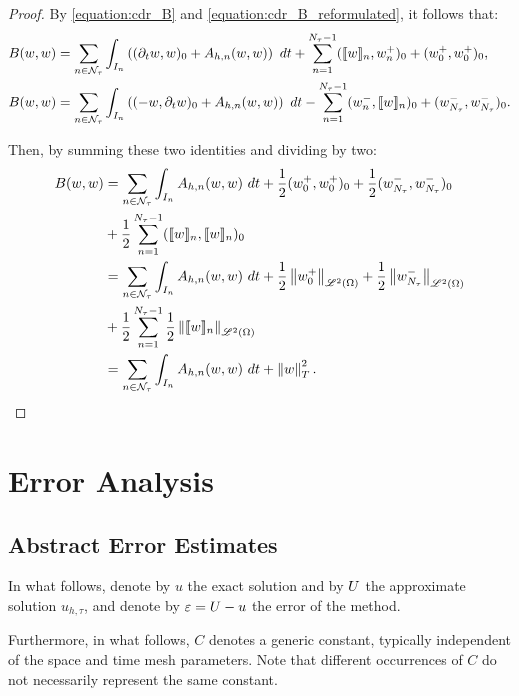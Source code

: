 \begin{proof}
    By \cref{equation:cdr_B} and \cref{equation:cdr_B_reformulated}, it follows that:
    \begin{align*}
        B(w, w) &= \sum_{n \in \mathcal{N}_{\tau}} \int_{I_n} \left( (\partial_t w, w )_0 + A_{h, n}(w, w) \right) ~ dt + \sum_{n = 1}^{N_{\tau} - 1} (\llbracket w \rrbracket_n, w_n^+ )_0 + (w_0^+, w_0^+ )_0, \\
        B(w, w) &= \sum_{n \in \mathcal{N}_{\tau}} \int_{I_n} \left( (-w, \partial_t w )_0 + A_{h, n}(w, w) \right) ~ dt - \sum_{n = 1}^{N_{\tau} - 1} (w_n^-, \llbracket w \rrbracket_n )_0 + (w_{N_{\tau}}^-, w_{N_{\tau}}^-)_0.
    \end{align*}

    Then, by summing these two identities and dividing by two:
    \begin{align*}
        B(w, w) &= \sum_{n \in \mathcal{N}_{\tau}} \int_{I_n} A_{h, n}(w, w) ~ dt + \frac12 (w_0^+, w_0^+ )_0 + \frac12 (w_{N_{\tau}}^-, w_{N_{\tau}}^-)_0 \\
        &+ \frac12 \sum_{n = 1}^{N_{\tau} - 1} (\llbracket w \rrbracket_n, \llbracket w \rrbracket_n )_0 \\
        &= \sum_{n \in \mathcal{N}_{\tau}} \int_{I_n} A_{h, n}(w, w) ~ dt + \frac12 \left\lVert w_0^+ \right\rVert_{\mathscr{L}^{2}(\Omega)} + \frac12 \left\lVert w_{N_{\tau}}^- \right\rVert_{\mathscr{L}^{2}(\Omega)} \\
        &+ \frac12 \sum_{n = 1}^{N_{\tau} - 1} \frac12 \left\lVert  \llbracket w \rrbracket_n  \right\rVert_{\mathscr{L}^{2}(\Omega)} \\
        &= \sum_{n \in \mathcal{N}_{\tau}} \int_{I_n} A_{h, n}(w, w) ~ dt + \left\lVert w \right\rVert_{T}^2.
    \end{align*}
\end{proof}

\newpage
\section{Error Analysis} \label{sec:cdr_error_analysis}

\subsection{Abstract Error Estimates} \label{subsection:error_estimates}

In what follows, denote by $u$ the exact solution and by $U$ the approximate solution $u_{h, \tau}$, and denote by $\varepsilon = U - u$ the error of the method.

Furthermore, in what follows, $C$ denotes a generic constant, typically independent of the space and time mesh parameters. Note that different occurrences of $C$ do not necessarily represent the same constant.

